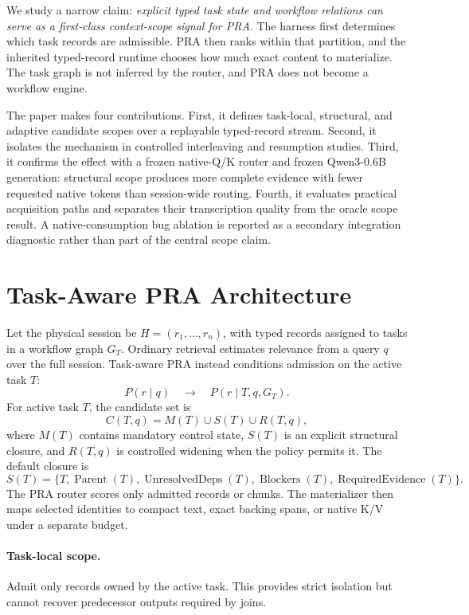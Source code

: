 \documentclass[10pt]{article}
\begin{document}
We study a narrow claim: \emph{explicit typed task state and workflow relations can serve as a first-class context-scope signal for PRA}. The harness first determines which task records are admissible. PRA then ranks within that partition, and the inherited typed-record runtime chooses how much exact content to materialize. The task graph is not inferred by the router, and PRA does not become a workflow engine.

The paper makes four contributions. First, it defines task-local, structural, and adaptive candidate scopes over a replayable typed-record stream. Second, it isolates the mechanism in controlled interleaving and resumption studies. Third, it confirms the effect with a frozen native-Q/K router and frozen Qwen3-0.6B generation: structural scope produces more complete evidence with fewer requested native tokens than session-wide routing. Fourth, it evaluates practical acquisition paths and separates their transcription quality from the oracle scope result. A native-consumption bug ablation is reported as a secondary integration diagnostic rather than part of the central scope claim.

\section{Task-Aware PRA Architecture}
Let the physical session be $H=(r_1,\ldots,r_n)$, with typed records assigned to tasks in a workflow graph $G_T$. Ordinary retrieval estimates relevance from a query $q$ over the full session. Task-aware PRA instead conditions admission on the active task $T$:
\[
P(r\mid q) \quad\longrightarrow\quad P(r\mid T,q,G_T).
\]
For active task $T$, the candidate set is
\[
C(T,q)=M(T)\cup S(T)\cup R(T,q),
\]
where $M(T)$ contains mandatory control state, $S(T)$ is an explicit structural closure, and $R(T,q)$ is controlled widening when the policy permits it. The default closure is
\[
S(T)=\{T,\operatorname{Parent}(T),\operatorname{UnresolvedDeps}(T),
\operatorname{Blockers}(T),\operatorname{RequiredEvidence}(T)\}.
\]
The PRA router scores only admitted records or chunks. The materializer then maps selected identities to compact text, exact backing spans, or native K/V under a separate budget.

\paragraph{Task-local scope.}
Admit only records owned by the active task. This provides strict isolation but cannot recover predecessor outputs required by joins.
\end{document}
